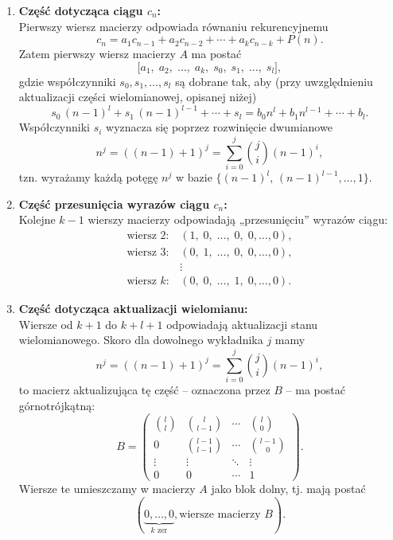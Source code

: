 \documentclass[12pt]{article}
\begin{document}
\begin{enumerate}
    \item \textbf{Część dotycząca ciągu \(c_n\):} \\
    Pierwszy wiersz macierzy odpowiada równaniu rekurencyjnemu
    \[
    c_n = a_1 c_{n-1} + a_2 c_{n-2} + \cdots + a_k c_{n-k} + P(n).
    \]
    Zatem pierwszy wiersz macierzy \(A\) ma postać
    \[
    \bigl[a_1,\; a_2,\; \dots,\; a_k,\; s_0,\; s_1,\; \dots,\; s_l\bigr],
    \]
    gdzie współczynniki \(s_0, s_1, \dots, s_l\) są dobrane tak, aby (przy uwzględnieniu aktualizacji części wielomianowej, opisanej niżej)
    \[
    s_0\,(n-1)^l + s_1\,(n-1)^{l-1} + \cdots + s_l = b_0 n^l + b_1 n^{l-1} + \cdots + b_l.
    \]
    Współczynniki \(s_i\) wyznacza się poprzez rozwinięcie dwumianowe
    \[
    n^j = ((n-1)+1)^j = \sum_{i=0}^{j} \binom{j}{i}(n-1)^i,
    \]
    tzn. wyrażamy każdą potęgę \( n^j \) w bazie \(\{(n-1)^l,\,(n-1)^{l-1},\dots,1\}\).

    \item \textbf{Część przesunięcia wyrazów ciągu \(c_n\):} \\
    Kolejne \(k-1\) wierszy macierzy odpowiadają „przesunięciu” wyrazów ciągu:
    \[
    \begin{array}{rcl}
    \text{wiersz }2: & (1,\;0,\; \dots,\;0,\;0,\dots,0), \\
    \text{wiersz }3: & (0,\;1,\; \dots,\;0,\;0,\dots,0), \\
    & \vdots \\
    \text{wiersz }k: & (0,\;0,\; \dots,\;1,\;0,\dots,0).
    \end{array}
    \]

    \item \textbf{Część dotycząca aktualizacji wielomianu:} \\
    Wiersze od \(k+1\) do \(k+l+1\) odpowiadają aktualizacji stanu wielomianowego. Skoro dla dowolnego wykładnika \(j\) mamy
    \[
    n^j = ((n-1)+1)^j = \sum_{i=0}^{j} \binom{j}{i}(n-1)^i,
    \]
    to macierz aktualizująca tę część – oznaczona przez \(B\) – ma postać górnotrójkątną:
    \[
    B = \begin{pmatrix}
    \binom{l}{l} & \binom{l}{l-1} & \cdots & \binom{l}{0} \\[1mm]
    0 & \binom{l-1}{l-1} & \cdots & \binom{l-1}{0} \\[1mm]
    \vdots & \vdots & \ddots & \vdots \\[1mm]
    0 & 0 & \cdots & 1
    \end{pmatrix}.
    \]
    Wiersze te umieszczamy w macierzy \(A\) jako blok dolny, tj. mają postać
    \[
    (\underbrace{0,\dots,0}_{k \text{ zer}},\text{wiersze macierzy } B).
    \]
\end{enumerate}
\end{document}
